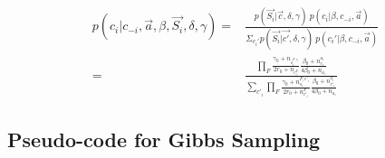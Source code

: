 \documentclass[../main.tex]{subfiles}
\begin{document}
\begin{equation}\label{postC}
\begin{split}
p(c_{i}| c_{-i}, \vec{a}, \beta, \vec{S_{i}}, \delta, \gamma) = &
\frac{p(\vec{S_{i}}| \vec{c}, \delta, \gamma)\ p(c_{i}|\beta, c_{-i}, \vec{a})}{\Sigma_{c_{i}'}p(\vec{S_{i}}| \vec{c'}, \delta, \gamma)\  p(c_{i}'|\beta, c_{-i}, \vec{a})}\\
=& \frac{ \prod_{F}\frac{\gamma_{0}+n_{s^{F, c_{i}}_{i}}}{2r_{0}+n_{c^{F}_{i}}}%
\frac{\beta_{0}+n_{c_{i}}^{a_{i}}}{4\beta_{0}+n_{a_{i}}}%
}%
{\sum_{c'_{i}}\prod_{F}\frac{\gamma_{0}+n^{F, c'_{i}}_{s_{i}}}{2r_{0}+n^{F}_{c'_{i}}}%
\frac{\beta_{0}+n_{c'_{i}}^{a_{i}}}{4\beta_{0}+n_{a_{i}}} %
}%
\end{split}
\end{equation}
\begin{comment}
\begin{equation}\label{postC}
\begin{split}
p(c_{i}| c_{-i}, \vec{a}, \beta, \vec{S_{i}}, \delta, \gamma, l_{i}, \lambda, \eta) = &
\frac{p(\vec{S_{i}}| \vec{c}, \delta, \gamma)\ p(l_{i} |\vec{c},\lambda, \eta)\ p(c_{i}|\beta, c_{-i}, \vec{a})}{\Sigma_{c_{i}'}p(\vec{S_{i}}| \vec{c'}, \delta, \gamma)\ p(l_{i} |\vec{c'},\lambda, \eta)\ p(c_{i}'|\beta, c_{-i}, \vec{a})}\\
=& \frac{ \prod_{F}\frac{\gamma_{0}+n_{s^{F, c_{i}}_{i}}}{2r_{0}+n_{c^{F}_{i}}}%
\frac{\eta_{0}+n_{l_{i}}^{c_{i}}}{2\eta_{0}+n_{c_{i}}}%
\frac{\beta_{0}+n_{c_{i}}^{a_{i}}}{4\beta_{0}+n_{a_{i}}}%
}%
{\sum_{c'_{i}}\prod_{F}\frac{\gamma_{0}+n^{F, c'_{i}}_{s_{i}}}{2r_{0}+n^{F}_{c'_{i}}}%
\frac{\eta_{0}+n_{l_{i}}^{c'_{i}}}{2\eta_{0}+n_{c'_{i}}}%
\frac{\beta_{0}+n_{c'_{i}}^{a_{i}}}{4\beta_{0}+n_{a_{i}}} %
}%
\end{split}
\end{equation}
\end{comment}

\subsection{Pseudo-code for Gibbs Sampling}
\end{document}
